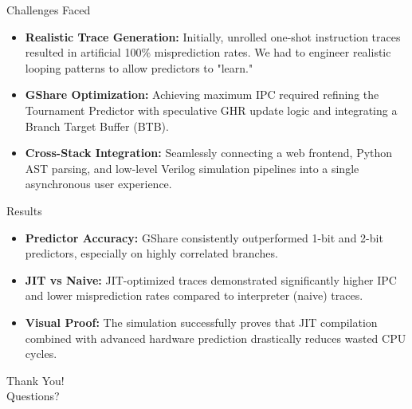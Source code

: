\documentclass{beamer}
\begin{document}
\begin{frame}{Challenges Faced}
  \begin{itemize}
    \item \textbf{Realistic Trace Generation:} Initially, unrolled one-shot instruction traces resulted in artificial 100\% misprediction rates. We had to engineer realistic looping patterns to allow predictors to "learn."
    \item \textbf{GShare Optimization:} Achieving maximum IPC required refining the Tournament Predictor with speculative GHR update logic and integrating a Branch Target Buffer (BTB).
    \item \textbf{Cross-Stack Integration:} Seamlessly connecting a web frontend, Python AST parsing, and low-level Verilog simulation pipelines into a single asynchronous user experience.
  \end{itemize}
\end{frame}

\begin{frame}{Results}
  \begin{itemize}
    \item \textbf{Predictor Accuracy:} GShare consistently outperformed 1-bit and 2-bit predictors, especially on highly correlated branches.
    \item \textbf{JIT vs Naive:} JIT-optimized traces demonstrated significantly higher IPC and lower misprediction rates compared to interpreter (naive) traces.
    \item \textbf{Visual Proof:} The simulation successfully proves that JIT compilation combined with advanced hardware prediction drastically reduces wasted CPU cycles.
  \end{itemize}
\end{frame}

\begin{frame}
  \begin{center}
    \Huge Thank You! \\
    \vspace{0.5cm}
    \Large Questions?
  \end{center}
\end{frame}
\end{document}
